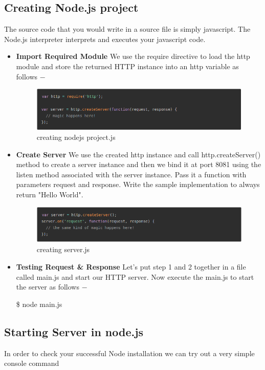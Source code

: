 \noindent \subsection{Creating Node.js project} The source code that you would write in a source file is simply javascript. The Node.js interpreter interprets and executes your javascript code.
\begin{itemize}
\item {\bf{Import Required Module}} We use the require directive to load the http module and store the returned HTTP instance into an http variable as follows −
\begin{figure}[h]
\centering \includegraphics[scale=0.5]{images/1.png}
\caption{creating nodejs project.js}
\end{figure}

\item {\bf{Create Server}} We use the created http instance and call http.createServer() method to create a server instance and then we bind it at port 8081 using the listen method associated with the server instance. Pass it a function with parameters request and response. Write the sample implementation to always return "Hello World".
\begin{figure}[h]
\centering \includegraphics[scale=0.5]{images/2.png}
\caption{creating server.js}
\end{figure}

\item {\bf{Testing Request \& Response}} Let's put step 1 and 2 together in a file called main.js and start our HTTP server. Now execute the main.js to start the server as follows −

	\$ node main.js \\

\end{itemize}
\subsection{Starting Server in node.js}
In order to check your successful Node installation we can try out a very simple console command\\

